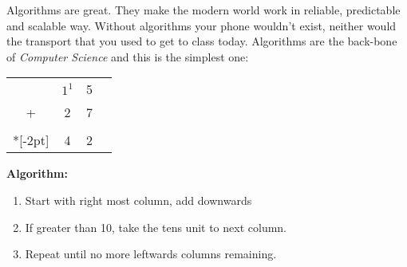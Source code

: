 Algorithms are great. They make the modern world work in reliable, predictable and scalable way. Without algorithms your phone wouldn't exist, neither would the transport that you used to get to class today. Algorithms are the back-bone of \emph{Computer Science} and this is the simplest one:

\begin{multicols}{2}
\begin{minipage}{1in}
\begin{tabular}{cccc}
      &$1^1$&5\\
    + &2&7\\
    \hline\\*[-2pt]
    &4&2\\
    \hline
\end{tabular}
\end{minipage}
    \begin{minipage}{4in}
        \Large\textbf{Algorithm:}\vspace*{-0.2cm}
\begin{solutionorbox}[2in]
    \begin{enumerate}
        \item Start with right most column, add downwards
        \item If greater than 10, take the tens unit to next column.
        \item Repeat until no more leftwards columns remaining.
    \end{enumerate}
\end{solutionorbox}
    \end{minipage}
\end{multicols}

